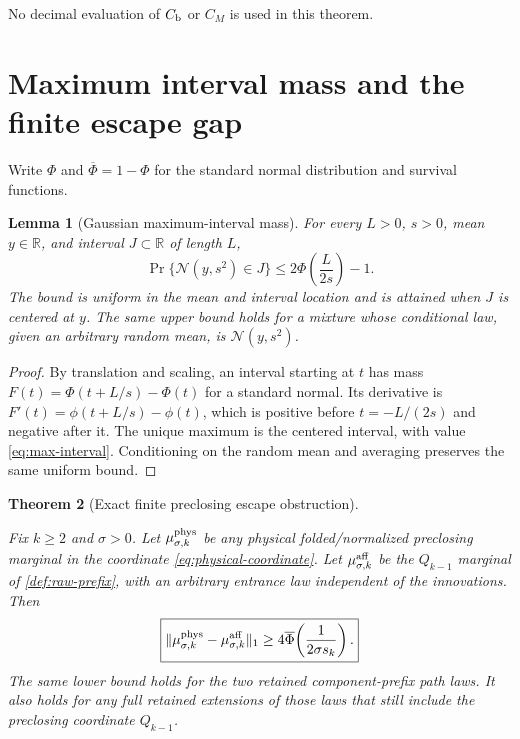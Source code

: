 \documentclass[11pt]{article}
\newtheorem{theorem}{Theorem}[section]
\newtheorem{lemma}[theorem]{Lemma}
\theoremstyle{definition}
\theoremstyle{remark}
\newcommand{\R}{\mathbb R}
\newcommand{\cN}{\mathcal N}
\newcommand{\Phibar}{\overline\Phi}
\begin{document}
No decimal evaluation of $C_{\rm b}$ or $C_M$ is used in this theorem.

\section{Maximum interval mass and the finite escape gap}

Write $\Phi$ and $\Phibar=1-\Phi$ for the standard normal distribution and
survival functions.

\begin{lemma}[Gaussian maximum-interval mass]\label{lem:max-interval}
For every $L>0$, $s>0$, mean $y\in\R$, and interval $J\subset\R$ of
length $L$,
\begin{equation}\label{eq:max-interval}
 \Pr\{\cN(y,s^2)\in J\}
 \le2\Phi\!\left(\frac{L}{2s}\right)-1.
\end{equation}
The bound is uniform in the mean and interval location and is attained when
$J$ is centered at $y$.  The same upper bound holds for a mixture whose
conditional law, given an arbitrary random mean, is $\cN(y,s^2)$.
\end{lemma}

\begin{proof}
By translation and scaling, an interval starting at $t$ has mass
$F(t)=\Phi(t+L/s)-\Phi(t)$ for a standard normal.  Its derivative is
$F'(t)=\phi(t+L/s)-\phi(t)$, which is positive before
$t=-L/(2s)$ and negative after it.  The unique maximum is the centered
interval, with value \eqref{eq:max-interval}.  Conditioning on the random
mean and averaging preserves the same uniform bound.
\end{proof}

\begin{theorem}[Exact finite preclosing escape obstruction]
\label{thm:finite-obstruction}
\leavevmode\par\noindent
Fix $k\ge2$ and $\sigma>0$.  Let $\mu^{\rm phys}_{\sigma,k}$ be any physical folded/normalized
preclosing marginal in the coordinate \eqref{eq:physical-coordinate}.  Let
$\mu^{\rm aff}_{\sigma,k}$ be the $Q_{k-1}$ marginal of
\cref{def:raw-prefix}, with an arbitrary entrance law independent of the
innovations.  Then
\begin{equation}\label{eq:finite-lower}
 \boxed{
 \|\mu^{\rm phys}_{\sigma,k}
     -\mu^{\rm aff}_{\sigma,k}\|_1
 \ge4\Phibar\!\left(\frac1{2\sigma s_k}\right).}
\end{equation}
The same lower bound holds for the two retained component-prefix path laws.
It also holds for any full retained extensions of those laws that still
include the preclosing coordinate $Q_{k-1}$.
\end{theorem}
\end{document}
